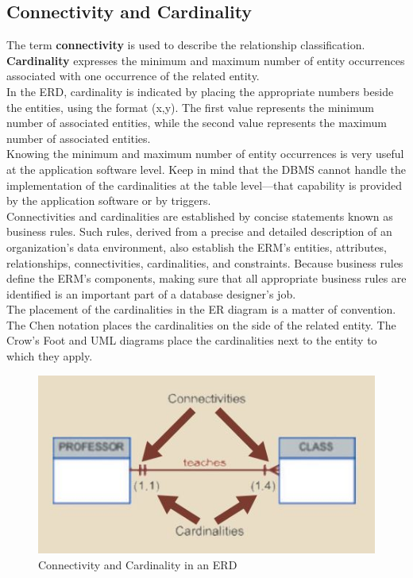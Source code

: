 \documentclass[a4paper, 12pt, titlepage]{report}
\begin{document}
{\subsection{Connectivity and Cardinality}
The term \textbf{connectivity} is used to describe the relationship classification. \textbf{Cardinality} expresses the minimum and maximum number of entity occurrences associated with one occurrence of the related entity. \\In the ERD, cardinality is indicated by placing the appropriate numbers beside the entities, using the format (x,y). The first value represents the minimum number of associated entities, while the second value represents the maximum number of associated entities. \\Knowing the minimum and maximum number of entity occurrences is very useful at the application software level. Keep in mind that the DBMS cannot handle the implementation of the cardinalities at the table level—that capability is provided by the application software or by triggers. \\Connectivities and cardinalities are established by concise statements known as business rules. Such rules, derived from a precise and detailed description of an organization’s data environment, also establish the ERM’s entities, attributes, relationships, connectivities, cardinalities, and constraints. Because business rules define the ERM’s components, making sure that all appropriate business rules are identified is an important part of a database designer’s job.\\ The placement of the cardinalities in the ER diagram is a matter of convention. The Chen notation places the cardinalities on the side of the related entity. The Crow’s Foot and UML diagrams place the cardinalities next to the entity to which they apply.
\begin{figure}[H]
\centering
\includegraphics[scale=0.8]{ConnCard}
\caption{Connectivity and Cardinality in an ERD}
\end{figure}
}
\end{document}
